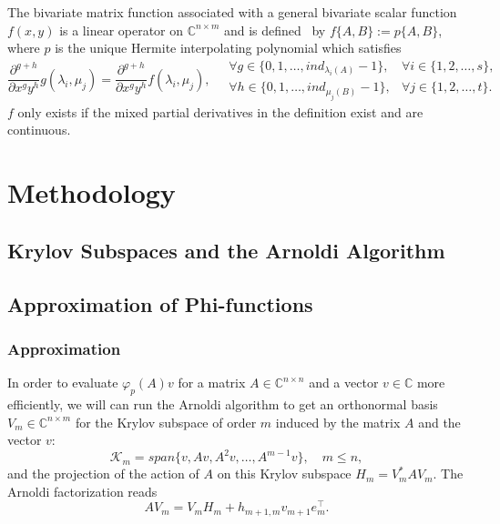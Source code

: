 The bivariate matrix function associated with a general bivariate scalar function $f(x, y)$ is a linear
operator on $\mathbb{C}^{n \times m}$ and is defined~\cite{kressner2014bivariate} by
$f\{A, B\} := p\{A, B\}$, where $p$ is the unique Hermite interpolating polynomial which
satisfies
\begin{equation*}
    \frac{\partial^{g+h}}{\partial x^g y^h}g(\lambda_i, \mu_j)
    = \frac{\partial^{g+h}}{\partial x^g y^h}f(\lambda_i, \mu_j),
    \quad
    \begin{matrix}
        \forall g \in \{0, 1, \dots, ind_{\lambda_i(A)}-1\},
        & \forall i \in \{1, 2, \dots, s\},
        \\
        \forall h \in \{0, 1, \dots, ind_{\mu_j(B)}-1\},
        & \forall j \in \{1, 2, \dots, t\}.
    \end{matrix}
\end{equation*}
$f$ only exists if the mixed partial derivatives in the definition exist and are continuous.

\section{Methodology}\label{sec:methods}

\subsection{Krylov Subspaces and the Arnoldi Algorithm}\label{sec:arnoldi}

\subsection{Approximation of Phi-functions}\label{sec:krylovmethodunivariate}

\subsubsection{Approximation}
In order to evaluate $\varphi_p(A)v$ for a matrix $A \in \mathbb{C}^{n \times n}$ and a vector $v \in \mathbb{C}$
more efficiently, we will can run the Arnoldi algorithm to get an orthonormal basis $V_m \in \mathbb{C}^{n \times m}$
for the Krylov subspace of order $m$ induced by the matrix $A$ and the vector $v$:
\begin{equation}
    \mathcal{K}_m = span \{ v, Av, A^{2}v, \dots, A^{m-1}v \}, \quad m \leq n,
\end{equation}
and the projection of the action of $A$ on this Krylov subspace $H_m = V_m^* A V_m$. The Arnoldi factorization
reads
\begin{equation}
    \label{eq:arnoldifactorization}
    A V_m = V_m H_m + h_{m+1, m} v_{m+1} e_m^\top.
\end{equation}

